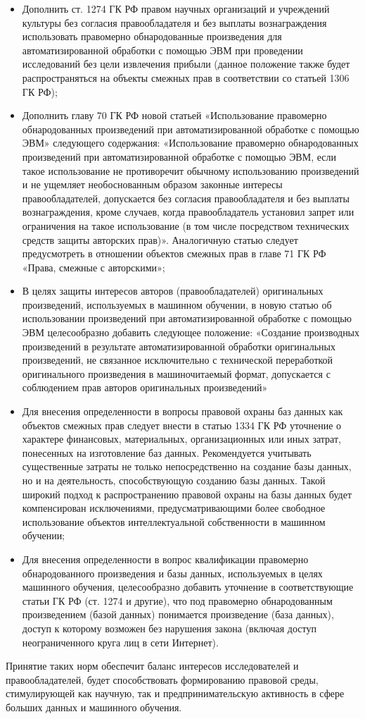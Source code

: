 \begin{itemize}
  \item Дополнить ст. 1274 ГК РФ правом научных организаций и учреждений
  культуры без согласия правообладателя и без выплаты вознаграждения
  использовать правомерно обнародованные произведения для автоматизированной
  обработки с помощью ЭВМ при проведении исследований без цели извлечения
  прибыли (данное положение также будет распространяться на объекты смежных
  прав в соответствии со статьей 1306 ГК РФ);
  \item Дополнить главу 70 ГК РФ новой статьей «Использование правомерно
  обнародованных произведений при автоматизированной обработке с помощью ЭВМ»
  следующего содержания: «Использование правомерно обнародованных произведений
  при автоматизированной обработке с помощью ЭВМ, если такое использование не
  противоречит обычному использованию произведений и не ущемляет
  необоснованным образом законные интересы правообладателей, допускается без
  согласия правообладателя и без выплаты вознаграждения, кроме случаев, когда
  правообладатель установил запрет или ограничения на такое использование (в
  том числе посредством технических средств защиты авторских прав)».
  Аналогичную статью следует предусмотреть в отношении объектов смежных прав
  в главе 71 ГК РФ «Права, смежные с авторскими»;
  \item В целях защиты интересов авторов (правообладателей) оригинальных
  произведений, используемых в машинном обучении, в новую статью об
  использовании произведений при автоматизированной обработке с помощью ЭВМ
  целесообразно добавить следующее положение: «Создание производных
  произведений в результате автоматизированной обработки оригинальных
  произведений, не связанное исключительно с технической переработкой
  оригинального произведения в машиночитаемый формат, допускается с соблюдением
  прав авторов оригинальных произведений»
  \item Для внесения определенности в вопросы правовой охраны баз данных как
  объектов смежных прав следует внести в статью 1334 ГК РФ уточнение о
  характере финансовых, материальных, организационных или иных затрат,
  понесенных на изготовление баз данных. Рекомендуется учитывать существенные
  затраты не только непосредственно на создание базы данных, но и на
  деятельность, способствующую созданию базы данных. Такой широкий подход к
  распространению правовой охраны на базы данных будет компенсирован
  исключениями, предусматривающими более свободное использование объектов
  интеллектуальной собственности в машинном обучении;
  \item Для внесения определенности в вопрос квалификации правомерно
  обнародованного произведения и базы данных, используемых в целях машинного
  обучения, целесообразно добавить уточнение в соответствующие статьи ГК РФ
  (ст. 1274 и другие), что под правомерно обнародованным произведением (базой
  данных) понимается произведение (база данных), доступ к которому возможен
  без нарушения закона (включая доступ неограниченного круга лиц в сети
  Интернет).
\end{itemize}

Принятие таких норм обеспечит баланс интересов исследователей и
правообладателей, будет способствовать формированию правовой среды,
стимулирующей как научную, так и предпринимательскую активность в сфере больших
данных и машинного обучения.
